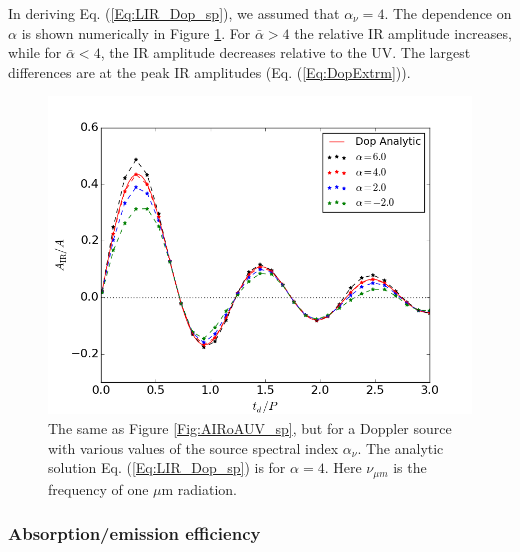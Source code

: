In deriving Eq. (\ref{Eq:LIR_Dop_sp}), we assumed that $\alpha_{\nu}=4$. The
dependence on $\alpha$ is shown numerically in Figure \ref{Fig:Dop_alph}. For
$\bar{\alpha} > 4$ the relative IR amplitude increases, while for $\bar{\alpha} < 4$, the
IR amplitude decreases relative to the UV. The largest differences are at the
peak IR amplitudes (Eq. (\ref{Eq:DopExtrm})).


\begin{figure}
\begin{center}
\includegraphics[scale=0.33]{figures/ch5/AIRplots/DopvsAlpha_AIRoAUV_J1p5708_numin0_numx5_reclim2_TRHS}
\end{center}
%
\caption{The same as Figure \ref{Fig:AIRoAUV_sp}, but for a Doppler source
with various values of the source spectral index $\alpha_{\nu}$. The analytic
solution Eq. (\ref{Eq:LIR_Dop_sp}) is for $\alpha=4$. Here $\nu_{\mu m}$ is 
the frequency of one $\mu$m radiation.}
%
\label{Fig:Dop_alph}
\end{figure}



\subsubsection{Absorption/emission efficiency}

